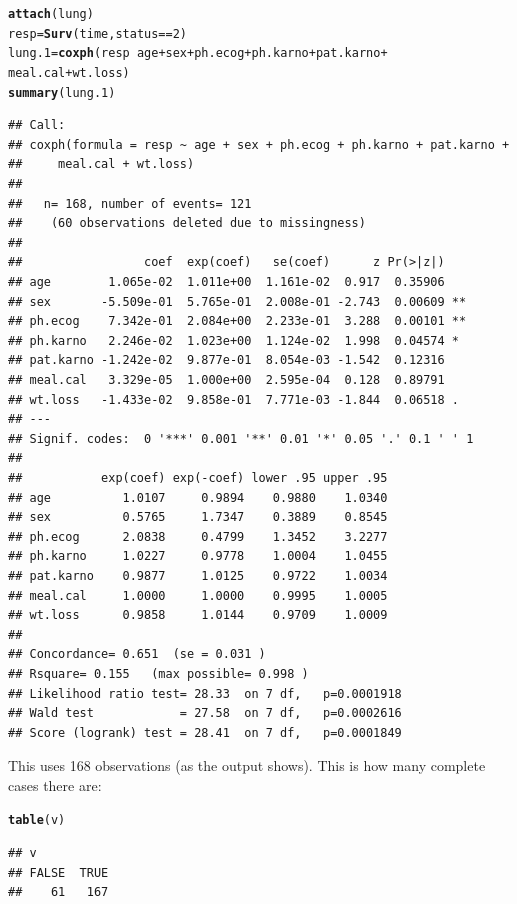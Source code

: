 \documentclass{article}\usepackage[]{graphicx}\usepackage[]{color}
\makeatletter
\newcommand{\hlnum}[1]{\textcolor[rgb]{0.686,0.059,0.569}{#1}}%
\newcommand{\hlopt}[1]{\textcolor[rgb]{0,0,0}{#1}}%
\newcommand{\hlstd}[1]{\textcolor[rgb]{0.345,0.345,0.345}{#1}}%
\newcommand{\hlkwb}[1]{\textcolor[rgb]{0.69,0.353,0.396}{#1}}%
\newcommand{\hlkwd}[1]{\textcolor[rgb]{0.737,0.353,0.396}{\textbf{#1}}}%
\newenvironment{kframe}{%
 \def\at@end@of@kframe{}%
 \ifinner\ifhmode%
  \def\at@end@of@kframe{\end{minipage}}%
  \begin{minipage}{\columnwidth}%
 \fi\fi%
 \def\FrameCommand##1{\hskip\@totalleftmargin \hskip-\fboxsep
 \colorbox{shadecolor}{##1}\hskip-\fboxsep
     \hskip-\linewidth \hskip-\@totalleftmargin \hskip\columnwidth}%
 \MakeFramed {\advance\hsize-\width
   \@totalleftmargin\z@ \linewidth\hsize
   \@setminipage}}%
 {\par\unskip\endMakeFramed%
 \at@end@of@kframe}
\newenvironment{knitrout}{}{} %
\makeatother
\begin{document}
\begin{knitrout}
\color{fgcolor}\begin{kframe}
\begin{alltt}
\hlkwd{attach}\hlstd{(lung)}
\hlstd{resp}\hlkwb{=}\hlkwd{Surv}\hlstd{(time,status}\hlopt{==}\hlnum{2}\hlstd{)}
\hlstd{lung.1}\hlkwb{=}\hlkwd{coxph}\hlstd{(resp}\hlopt{~}\hlstd{age}\hlopt{+}\hlstd{sex}\hlopt{+}\hlstd{ph.ecog}\hlopt{+}\hlstd{ph.karno}\hlopt{+}\hlstd{pat.karno}\hlopt{+}
  \hlstd{meal.cal}\hlopt{+}\hlstd{wt.loss)}
\hlkwd{summary}\hlstd{(lung.1)}
\end{alltt}
\begin{verbatim}
## Call:
## coxph(formula = resp ~ age + sex + ph.ecog + ph.karno + pat.karno + 
##     meal.cal + wt.loss)
## 
##   n= 168, number of events= 121 
##    (60 observations deleted due to missingness)
## 
##                 coef  exp(coef)   se(coef)      z Pr(>|z|)   
## age        1.065e-02  1.011e+00  1.161e-02  0.917  0.35906   
## sex       -5.509e-01  5.765e-01  2.008e-01 -2.743  0.00609 **
## ph.ecog    7.342e-01  2.084e+00  2.233e-01  3.288  0.00101 **
## ph.karno   2.246e-02  1.023e+00  1.124e-02  1.998  0.04574 * 
## pat.karno -1.242e-02  9.877e-01  8.054e-03 -1.542  0.12316   
## meal.cal   3.329e-05  1.000e+00  2.595e-04  0.128  0.89791   
## wt.loss   -1.433e-02  9.858e-01  7.771e-03 -1.844  0.06518 . 
## ---
## Signif. codes:  0 '***' 0.001 '**' 0.01 '*' 0.05 '.' 0.1 ' ' 1
## 
##           exp(coef) exp(-coef) lower .95 upper .95
## age          1.0107     0.9894    0.9880    1.0340
## sex          0.5765     1.7347    0.3889    0.8545
## ph.ecog      2.0838     0.4799    1.3452    3.2277
## ph.karno     1.0227     0.9778    1.0004    1.0455
## pat.karno    0.9877     1.0125    0.9722    1.0034
## meal.cal     1.0000     1.0000    0.9995    1.0005
## wt.loss      0.9858     1.0144    0.9709    1.0009
## 
## Concordance= 0.651  (se = 0.031 )
## Rsquare= 0.155   (max possible= 0.998 )
## Likelihood ratio test= 28.33  on 7 df,   p=0.0001918
## Wald test            = 27.58  on 7 df,   p=0.0002616
## Score (logrank) test = 28.41  on 7 df,   p=0.0001849
\end{verbatim}
\end{kframe}
\end{knitrout}

This uses 168 observations (as the output shows). This is how many
complete cases there are:

\begin{knitrout}
\color{fgcolor}\begin{kframe}
\begin{alltt}
\hlkwd{table}\hlstd{(v)}
\end{alltt}
\begin{verbatim}
## v
## FALSE  TRUE 
##    61   167
\end{verbatim}
\end{kframe}
\end{knitrout}
\end{document}
